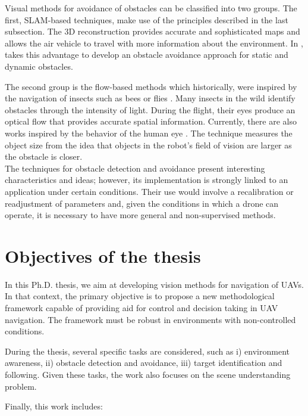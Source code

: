 Visual methods for avoidance of obstacles can be classified into two groups. The first, SLAM-based techniques, make use of the principles described in the last subsection. The 3D reconstruction provides accurate and sophisticated maps and allows the air vehicle to travel with more information about the environment. In \cite{Moreno-Armendariz.Calvo:ICMEAE:2014}, takes this advantage to develop an obstacle avoidance approach for static and dynamic obstacles. 

The second group is the flow-based methods which historically, were inspired by the navigation of insects such as bees \cite{Srinivasan.Gregory:PTBS:1992} or flies \cite{Franceschini.Ruffier.ea:InTech:2012}. Many insects in the wild identify obstacles through the intensity of light. During the flight, their eyes produce an optical flow that provides accurate spatial information. Currently, there are also works inspired by the behavior of the human eye \cite{Al-Kaff.Meng.ea:IVS:2016}. The technique measures the object size from the idea that objects in the robot's field of vision are larger as the obstacle is closer.\\

The techniques for obstacle detection and avoidance present interesting characteristics and ideas; however, its implementation is strongly linked to an application under certain conditions. Their use would involve a recalibration or readjustment of parameters and, given the conditions in which a drone can operate, it is necessary to have more general and non-supervised methods.
 
\section{Objectives of the thesis}\label{sec:thesis_objectives}

In this Ph.D. thesis, we aim at developing vision methods for navigation of UAVs. In that context, the primary objective is to propose a new methodological framework capable of providing aid for control and decision taking in UAV navigation. The framework must be robust in environments with non-controlled conditions. 

During the thesis, several specific tasks are considered, such as i) environment awareness, ii) obstacle detection and avoidance, iii) target identification and following. Given these tasks, the work also focuses on the scene understanding problem. 

Finally, this work includes:  


